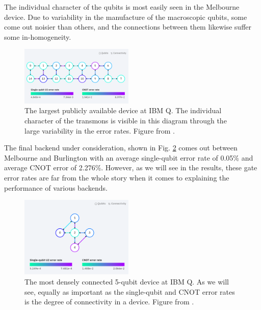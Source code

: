 The individual character of the qubits is most easily seen in the Melbourne
device. Due to variability in the manufacture of the macroscopic qubits, some
come out noisier than others, and the connections between them likewise suffer
some in-homogeneity.
\begin{figure}[h] \centering
\includegraphics[width=0.48\textwidth]{images/connection_diagram_melbourne.png}
  \caption{The largest publicly available device at IBM Q. The individual
character of the transmons is visible in this diagram through the large
variability in the error rates. Figure from \cite{ibmq_16_melbourne}.}
  \label{fig:melbourne_connections}
\end{figure}

The final backend under consideration, shown in Fig.
\ref{fig:yorktown_connections} comes out between Melbourne and Burlington with
an average single-qubit error rate of 0.05\% and average CNOT error of 2.276\%.
However, as we will see in the results, these gate error rates are far from the
whole story when it comes to explaining the performance of various backends.
\begin{figure}[h] \centering
\includegraphics[width=0.48\textwidth]{images/connection_diagram_ibmqx2.png}
  \caption{The most densely connected 5-qubit device at IBM Q. As we will see,
equally as important as the single-qubit and CNOT error rates is the degree of
connectivity in a device. Figure from \cite{ibmq_yorktown}.}
  \label{fig:yorktown_connections}
\end{figure}

